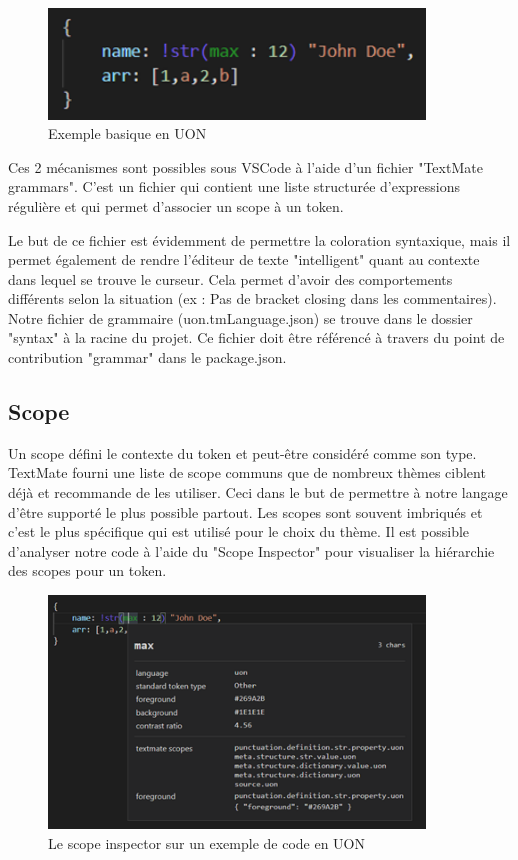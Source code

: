 \documentclass[
    iict, %
    il, %
]{heig-tb}
\begin{document}
\begin{figure}[!ht]
    \begin{center}
        \includegraphics[width=10cm]{assets/figures/basic-uon.png}
    \end{center}
    \caption[code UON]{\label{basic-uon} Exemple basique en UON}
\end{figure}

Ces 2 mécanismes sont possibles sous VSCode à l'aide d'un fichier "TextMate grammars". C'est un fichier qui contient une liste structurée d'expressions régulière et qui permet d'associer un scope à un token.

Le but de ce fichier est évidemment de permettre la coloration syntaxique, mais il permet également de rendre l'éditeur de texte "intelligent" quant au contexte dans lequel se trouve le curseur. Cela permet d'avoir des comportements différents selon la situation (ex : Pas de bracket closing dans les commentaires).
Notre fichier de grammaire (uon.tmLanguage.json) se trouve dans le dossier "syntax" à la racine du projet.
Ce fichier doit être référencé à travers du point de contribution "grammar" dans le package.json.

\subsection{Scope}
Un scope défini le contexte du token et peut-être considéré comme son type.
TextMate fourni une liste de scope communs que de nombreux thèmes ciblent déjà et recommande de les utiliser. Ceci dans le but de permettre à notre langage d'être supporté le plus possible partout. 
Les scopes sont souvent imbriqués et c'est le plus spécifique qui est utilisé pour le choix du thème.
Il est possible d'analyser notre code à l'aide du "Scope Inspector" pour visualiser la hiérarchie des scopes pour un token.

\begin{figure}[!ht]
    \begin{center}
        \includegraphics[width=10cm]{assets/figures/scope-inspector.png}
    \end{center}
    \caption[Scope inspector]{\label{basic-uon} Le scope inspector sur un exemple de code en UON}
\end{figure}
\end{document}
